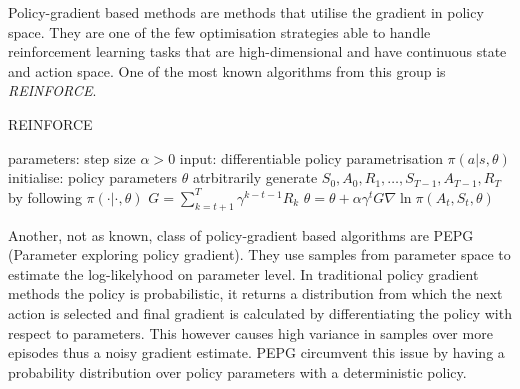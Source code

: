 Policy-gradient based methods are methods that utilise the gradient in policy space. They are one  of the few optimisation strategies able to handle reinforcement learning tasks that are high-dimensional and have continuous state and action space. One of the most known algorithms from this group is \emph{REINFORCE}.
\begin{algorithm}[h]
    \begin{algorithmic}[1]
    \caption{REINFORCE}
    \label{alg:reinforce}
        \State parameters: step size $\alpha>0$ 
        \State input: differentiable policy parametrisation $\pi(a|s,\theta)$
        \State initialise: policy parameters $\theta$ atrbitrarily
            \State generate $S_0, A_0, R_1,\dots,S_{T-1},A_{T-1},R_T$ by following $\pi(\cdot|\cdot,\theta)$
                \State $G = \sum_{k=t+1}^T\gamma^{k-t-1}R_k$
                \State $\theta = \theta + \alpha \gamma^t G \nabla\ln\pi(A_t,S_t,\theta)$
            \EndFor
        \EndFor
    \end{algorithmic}
\end{algorithm}


Another, not as known, class of policy-gradient based algorithms are PEPG (Parameter exploring policy gradient).\cite{Sehnke2012} They use samples from parameter space to estimate the log-likelyhood on parameter level. In traditional policy gradient methods the policy is probabilistic, it returns a distribution from which the next action is selected and final gradient is calculated by differentiating the policy with respect to parameters. This however causes high variance in samples over more episodes thus a noisy gradient estimate. PEPG circumvent this issue by having a probability distribution over policy parameters with a deterministic policy.


